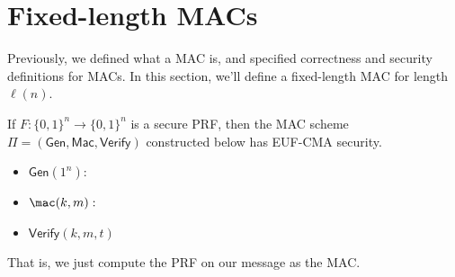 \documentclass[12pt]{tufte-book}
\newcommand{\getsr}{\xleftarrow{\$}}
\newcommand{\gen}{\mathsf{Gen}}
\newcommand{\Verify}{\mathsf{Verify}}
\begin{document}
  \newcommand{\nonnegl}{\mathsf{nonnegl}}


\section{Fixed-length MACs}

Previously, we defined what a MAC is, and specified correctness and security definitions for MACs. In this section, we'll define a fixed-length MAC for length $\ell(n)$.

\begin{theorem}
    If $F : \{0, 1\}^n \to \{0, 1\}^n$ is a secure PRF, then the MAC scheme $\Pi = (\mathsf{Gen}, \mathsf{Mac}, \mathsf{Verify})$ constructed below has EUF-CMA security.

    \begin{itemize}
        \item $\gen(1^n):$
        \item $\mac(k,m):$
        \item $\Verify(k, m, t)$
    \end{itemize}
    That is, we just compute the PRF on our message as the MAC.
\end{theorem}
\end{document}
